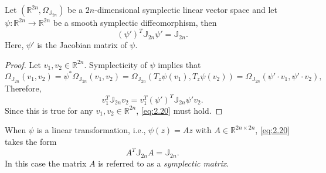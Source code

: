 \begin{proposition}
Let $(\mathbb R^{2n}, \Omega_{\mathbb J_{2n}})$ be a $2n$-dimensional symplectic linear vector space and let $\psi:\mathbb R^{2n} \to \mathbb R^{2n}$ be a smooth symplectic diffeomorphism, then
\begin{equation} \label{eq:2.20}
	(\psi')^T \mathbb J_{2n} \psi' =  \mathbb J_{2n}.	
\end{equation}
Here, $\psi'$ is the Jacobian matrix of $\psi$.
\end{proposition}
\begin{proof}
Let $v_1,v_2\in \mathbb R^{2n}$. Symplecticity of $\psi$ implies that
\begin{equation*}
	\Omega_{\mathbb J_{2n}}(v_1,v_2) = \psi^*\Omega_{\mathbb J_{2n}}(v_1,v_2) = \Omega_{\mathbb J_{2n}}( T_z \psi(v_1) , T_z \psi (v_2) ) = \Omega_{\mathbb J_{2n}}( \psi'\cdot v_1,\psi'\cdot v_2 ),
\end{equation*}
Therefore,
\begin{equation*}
	v_1^T \mathbb J_{2n} v_2 = v_1^T (\psi')^T \mathbb J_{2n} \psi' v_2.
\end{equation*}
Since this is true for any $v_1,v_2\in \mathbb R^{2n}$, \eqref{eq:2.20} must hold.
\end{proof}
When $\psi$ is a linear transformation, i.e., $\psi(z) = Az$ with $A\in \mathbb R^{2n\times 2n}$, \eqref{eq:2.20} takes the form
\begin{equation} \label{eq:2.201}
	A^T \mathbb J_{2n} A = \mathbb J_{2n}.
\end{equation}
In this case the matrix $A$ is referred to as a \emph{symplectic matrix}.

